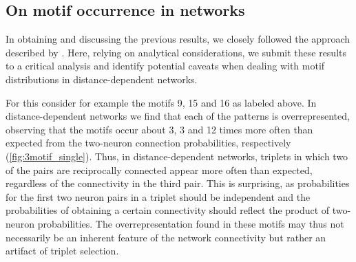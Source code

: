 \subsection*{On motif occurrence in networks}

In obtaining and discussing the previous results, we closely followed
the approach described by \textcite{Song2005}. Here, relying on
analytical considerations, we submit these results to a critical
analysis and identify potential caveats when dealing with motif
distributions in distance-dependent networks.

For this consider for example the motifs 9, 15 and 16 as labeled
above. In distance-dependent networks we find that each of the
patterns is overrepresented, observing that the motifs occur about 3,
3 and 12 times more often than expected from the two-neuron connection
probabilities, respectively (\autoref{fig:3motif_single}). Thus, in
distance-dependent networks, triplets in which two of the pairs are
reciprocally connected appear more often than expected, regardless of
the connectivity in the third pair. This is surprising, as
probabilities for the first two neuron pairs in a triplet should be
independent and the probabilities of obtaining a certain connectivity
should reflect the product of two-neuron probabilities. The
overrepresentation found in these motifs may thus not necessarily be
an inherent feature of the network connectivity but rather an artifact
of triplet selection.

